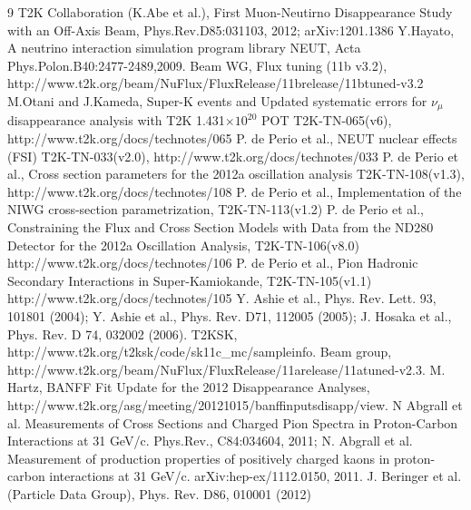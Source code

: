 \begin{thebibliography}{9}
%
   T2K Collaboration (K.Abe et al.), 
   First Muon-Neutirno Disappearance Study with an Off-Axis Beam,
   Phys.Rev.D85:031103, 2012; arXiv:1201.1386
%
%
  Y.Hayato, A neutrino interaction simulation program library NEUT,
  Acta Phys.Polon.B40:2477-2489,2009.
   Beam WG, Flux tuning (11b v3.2), http://www.t2k.org/beam/NuFlux/FluxRelease/11brelease/11btuned-v3.2
   M.Otani and J.Kameda,
   Super-K events and Updated systematic errors for $\nu_\mu$ disappearance analysis with T2K 1.431$\times10^{20}$ POT
   T2K-TN-065(v6),
   http://www.t2k.org/docs/technotes/065
  P. de Perio et al.,
  NEUT nuclear effects (FSI)
  T2K-TN-033(v2.0),
  http://www.t2k.org/docs/technotes/033
  P. de Perio et al.,
  Cross section parameters for the 2012a oscillation analysis
  T2K-TN-108(v1.3),
  http://www.t2k.org/docs/technotes/108
  P. de Perio et al.,
  Implementation of the NIWG cross-section parametrization,
  T2K-TN-113(v1.2) 
  P. de Perio et al.,
  Constraining the Flux and Cross Section Models with Data from the
  ND280 Detector for the 2012a Oscillation Analysis,
  T2K-TN-106(v8.0)
  http://www.t2k.org/docs/technotes/106
  P. de Perio et al.,
  Pion Hadronic Secondary Interactions in Super-Kamiokande,
  T2K-TN-105(v1.1)
  http://www.t2k.org/docs/technotes/105
  Y. Ashie et al., Phys. Rev. Lett. 93, 101801 (2004);
  Y. Ashie et al., Phys. Rev. D71, 112005 (2005); 
  J. Hosaka et al., Phys. Rev. D 74, 032002 (2006).
  T2KSK,
  http://www.t2k.org/t2ksk/code/sk11c\_mc/sampleinfo.
  Beam group,
  http://www.t2k.org/beam/NuFlux/FluxRelease/11arelease/11atuned-v2.3.
  M. Hartz,
  BANFF Fit Update for the 2012 Disappearance Analyses,
  http://www.t2k.org/asg/meeting/20121015/banffinputsdisapp/view.
%
%
  N Abgrall et al. Measurements of Cross Sections and Charged Pion Spectra in Proton-Carbon Interactions
  at 31 GeV/c. Phys.Rev., C84:034604, 2011;
  N. Abgrall et al. Measurement of production properties of positively charged kaons in proton-carbon
  interactions at 31 GeV/c. arXiv:hep-ex/1112.0150, 2011.
%
%
  J. Beringer et al. (Particle Data Group), Phys. Rev. D86, 010001 (2012)
%

\end{thebibliography}
